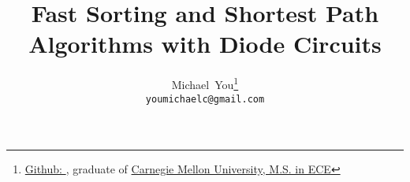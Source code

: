 \usepackage{arxiv}
\usepackage{util}

\usepackage[utf8]{inputenc} %
\usepackage[T1]{fontenc}    %
\usepackage{hyperref}       %
\usepackage{url}            %
\usepackage{booktabs}       %
\usepackage{amsfonts}       %
\usepackage{nicefrac}       %
\usepackage{microtype}      %
\usepackage{lipsum}		%
\usepackage{graphicx}
\usepackage{natbib}
\usepackage{doi}



\title{Fast Sorting and Shortest Path Algorithms with Diode Circuits}

\author{
  Michael~You\thanks{\href{https://github.com/mikinty}{Github: }, graduate of \href{https://www.cmu.edu/}{Carnegie Mellon University, M.S. in ECE}} \\
  \texttt{youmichaelc@gmail.com}
}

\renewcommand{\headeright}{Michael You}
\renewcommand{\undertitle}{}
\renewcommand{\shorttitle}{Fast Diode Circuits}

